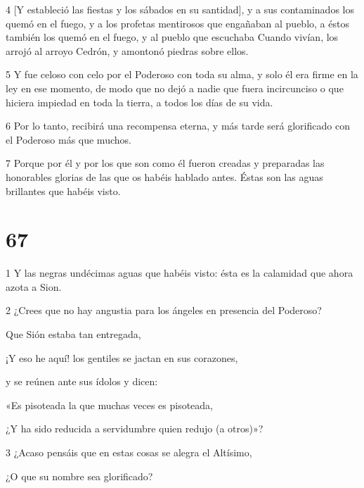 \par 4 [Y estableció las fiestas y los sábados en su santidad], y a sus contaminados los quemó en el fuego, y a los profetas mentirosos que engañaban al pueblo, a éstos también los quemó en el fuego, y al pueblo que escuchaba Cuando vivían, los arrojó al arroyo Cedrón, y amontonó piedras sobre ellos.

\par 5 Y fue celoso con celo por el Poderoso con toda su alma, y ​​solo él era firme en la ley en ese momento, de modo que no dejó a nadie que fuera incircunciso o que hiciera impiedad en toda la tierra, a todos los días de su vida.

\par 6 Por lo tanto, recibirá una recompensa eterna, y más tarde será glorificado con el Poderoso más que muchos.

\par 7 Porque por él y por los que son como él fueron creadas y preparadas las honorables glorias de las que os habéis hablado antes. Éstas son las aguas brillantes que habéis visto.

\chapter{67}

\par 1 Y las negras undécimas aguas que habéis visto: ésta es la calamidad que ahora azota a Sion.

\par 2 ¿Crees que no hay angustia para los ángeles en presencia del Poderoso?

\par Que Sión estaba tan entregada,

\par ¡Y eso he aquí! los gentiles se jactan en sus corazones,

\par y se reúnen ante sus ídolos y dicen:

\par «Es pisoteada la que muchas veces es pisoteada,

\par ¿Y ha sido reducida a servidumbre quien redujo (a otros)»?

\par 3 ¿Acaso pensáis que en estas cosas se alegra el Altísimo,

\par ¿O que su nombre sea glorificado?


